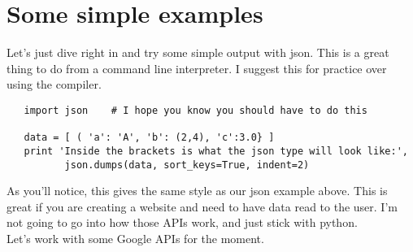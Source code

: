 \documentclass[11pt]{article}   %
\begin{document}
\section*{Some simple examples}
Let's just dive right in and try some simple output with json.  This is a great thing to do from a command line interpreter.  I suggest this for practice over using the compiler.
\begin{tcolorbox}
   \begin{lstlisting}
   import json    # I hope you know you should have to do this

   data = [ ( 'a': 'A', 'b': (2,4), 'c':3.0} ]
   print 'Inside the brackets is what the json type will look like:', 
          json.dumps(data, sort_keys=True, indent=2)
   \end{lstlisting}
\end{tcolorbox}
As you'll notice, this gives the same style as our json example above.  This is great if you are creating a website and need to have data read to the user.  I'm not going to go into how those APIs work, and just stick with python.
\\
Let's work with some Google APIs for the moment.
\end{document}
